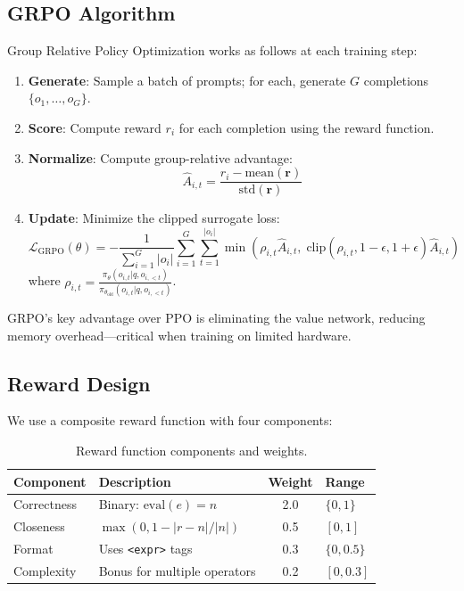 \documentclass[11pt, letterpaper]{article}
\begin{document}
\subsection{GRPO Algorithm}

Group Relative Policy Optimization \cite{deepseekmath} works as follows at each training step:

\begin{enumerate}
    \item \textbf{Generate}: Sample a batch of prompts; for each, generate $G$ completions $\{o_1, \ldots, o_G\}$.
    \item \textbf{Score}: Compute reward $r_i$ for each completion using the reward function.
    \item \textbf{Normalize}: Compute group-relative advantage:
    \[
        \hat{A}_{i,t} = \frac{r_i - \text{mean}(\mathbf{r})}{\text{std}(\mathbf{r})}
    \]
    \item \textbf{Update}: Minimize the clipped surrogate loss:
    \[
        \mathcal{L}_{\text{GRPO}}(\theta) = -\frac{1}{\sum_{i=1}^G |o_i|} \sum_{i=1}^G \sum_{t=1}^{|o_i|} \min\!\left( \rho_{i,t} \hat{A}_{i,t},\; \text{clip}(\rho_{i,t}, 1{-}\epsilon, 1{+}\epsilon) \hat{A}_{i,t} \right)
    \]
    where $\rho_{i,t} = \frac{\pi_\theta(o_{i,t} | q, o_{i,<t})}{\pi_{\theta_{\text{old}}}(o_{i,t} | q, o_{i,<t})}$.
\end{enumerate}

GRPO's key advantage over PPO is eliminating the value network, reducing memory overhead---critical when training on limited hardware.

\subsection{Reward Design}

We use a composite reward function with four components:

\begin{table}[H]
\centering
\caption{Reward function components and weights.}
\label{tab:rewards}
\begin{tabular}{llcl}
\toprule
\textbf{Component} & \textbf{Description} & \textbf{Weight} & \textbf{Range} \\
\midrule
Correctness & Binary: $\text{eval}(e) = n$ & 2.0 & $\{0, 1\}$ \\
Closeness & $\max(0, 1 - |r - n|/|n|)$ & 0.5 & $[0, 1]$ \\
Format & Uses \texttt{<expr>} tags & 0.3 & $\{0, 0.5\}$ \\
Complexity & Bonus for multiple operators & 0.2 & $[0, 0.3]$ \\
\bottomrule
\end{tabular}
\end{table}
\end{document}
